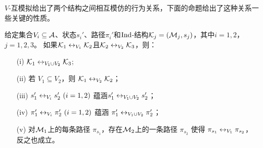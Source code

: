 $V$-互模拟给出了两个结构之间相互模仿的行为关系，下面的命题给出了这种关系一些关键的性质。
\begin{proposition}\label{prop:bisimilar:V}
	给定集合$V_i\subseteq {\cal A}$、状态$s_i'$、路径$\pi_i'$和$\textrm{Ind}$-结构${\cal K}_j=({\cal M}_j,s_j)$，其中$i=1,2$，$j=1,2,3$。
	如果${\cal K}_1 \leftrightarrow_{V_1} {\cal K}_2$且${\cal K}_2 \leftrightarrow_{V_2} {\cal K}_3$，则：
	\begin{itemize}
		\item[(i)] ${\cal K}_1\leftrightarrow_{V_1\cup V_2}{\cal K}_3$;
		\item[(ii)] 若 $V_1 \subseteq V_2$，则 ${\cal K}_1 \leftrightarrow_{V_2} {\cal K}_2$；
		\item[(iii)] $s_1'\leftrightarrow_{V_i}s_2'~(i=1,2)$ 蕴涵$s_1'\leftrightarrow_{V_1\cup V_2}s_2'$；
		\item[(iv)] $\pi_1'\leftrightarrow_{V_i}\pi_2'~(i=1,2)$ 蕴涵 $\pi_1'\leftrightarrow_{V_1\cup V_2}\pi_2'$；
		\item[(v)] 对${\cal M}_1$上的每条路径 $\pi_{s_1}$，存在${\cal M}_2$上的一条路径 $\pi_{s_2}$ 使得 $\pi_{s_1} \leftrightarrow_{V_1} \pi_{s_2}$，反之也成立。
	\end{itemize}
\end{proposition}
